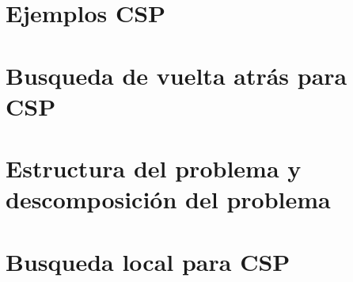     
    \section{Ejemplos CSP}%
    
    \section{Busqueda de vuelta atrás para CSP}%
    
    \section{Estructura del problema y descomposición del problema}%

    \section{Busqueda local para CSP}%
    